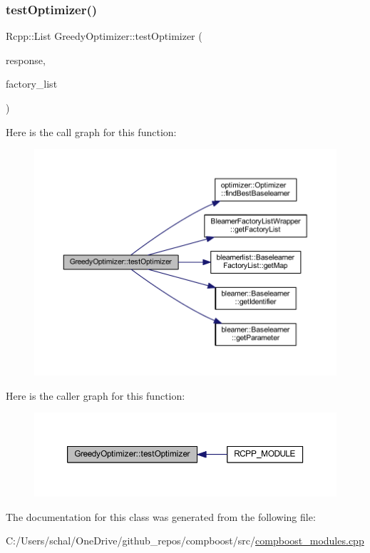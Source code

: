\subsubsection{\texorpdfstring{test\+Optimizer()}{testOptimizer()}}
{\footnotesize\ttfamily Rcpp\+::\+List Greedy\+Optimizer\+::test\+Optimizer (\begin{DoxyParamCaption}\item[{arma\+::vec \&}]{response,  }\item[{\mbox{\hyperlink{class_blearner_factory_list_wrapper}{Blearner\+Factory\+List\+Wrapper}}}]{factory\+\_\+list }\end{DoxyParamCaption})\hspace{0.3cm}{\ttfamily [inline]}}

Here is the call graph for this function\+:\nopagebreak
\begin{figure}[H]
\begin{center}
\leavevmode
\includegraphics[width=350pt]{class_greedy_optimizer_a30925396579c7cfb5b90b8c131495f3a_cgraph}
\end{center}
\end{figure}
Here is the caller graph for this function\+:\nopagebreak
\begin{figure}[H]
\begin{center}
\leavevmode
\includegraphics[width=350pt]{class_greedy_optimizer_a30925396579c7cfb5b90b8c131495f3a_icgraph}
\end{center}
\end{figure}


The documentation for this class was generated from the following file\+:\begin{DoxyCompactItemize}
\item 
C\+:/\+Users/schal/\+One\+Drive/github\+\_\+repos/compboost/src/\mbox{\hyperlink{compboost__modules_8cpp}{compboost\+\_\+modules.\+cpp}}\end{DoxyCompactItemize}
